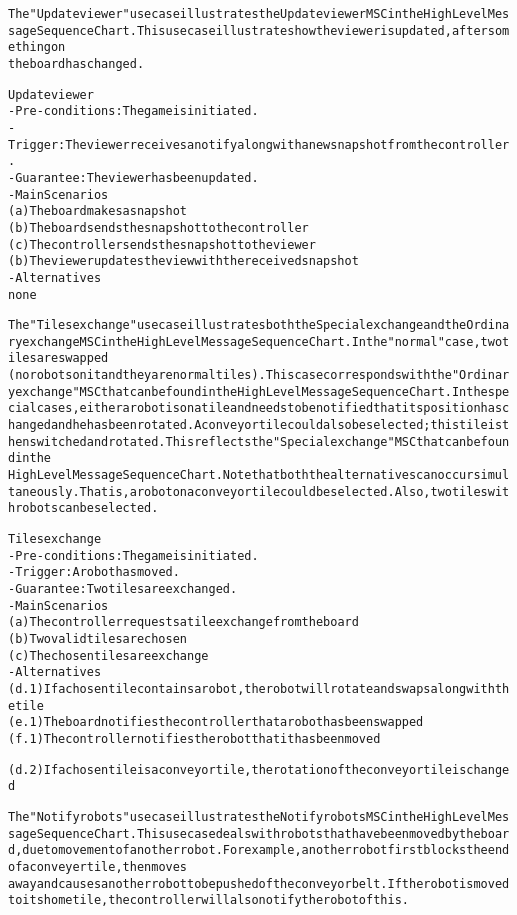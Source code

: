 \begin{alltt}
The "Update viewer" use case illustrates the Update viewer MSC in the High Level Message Sequence Chart. This use case illustrates how the viewer is updated, after something on 
the board has changed.

Update viewer
- Pre-conditions: The game is initiated.
- Trigger: The viewer receives a notify along with a new snapshot from the controller.
- Guarantee: The viewer has been updated.
- Main Scenarios
    (a) The board makes a snapshot
    (b) The board sends the snapshot to the controller
    (c) The controller sends the snapshot to the viewer
    (b) The viewer updates the view with the received snapshot
- Alternatives
    none

The "Tiles exchange" use case illustrates both the Special exchange and the Ordinary exchange MSC in the High Level Message Sequence Chart. In the "normal" case, two tiles are swapped
(no robots on it and they are normal tiles). This case corresponds with the "Ordinary exchange" MSC that can be found in the High Level Message Sequence Chart. In the special cases, either a robot is on a tile and needs to be notified that its position has changed and he has been rotated. A conveyor tile could also be selected; this tile is then switched and rotated. This reflects the "Special exchange" MSC that can be found in the
High Level Message Sequence Chart. Note that both the alternatives can occur simultaneously. That is, a robot on a conveyor tile could be selected. Also, two tiles with robots can be selected.

Tiles exchange
- Pre-conditions: The game is initiated.
- Trigger:  A robot has moved.
- Guarantee: Two tiles are exchanged.
- Main Scenarios
    (a) The controller requests a tile exchange from the board
    (b) Two valid tiles are chosen
    (c) The chosen tiles are exchange
- Alternatives
    (d.1) If a chosen tile contains a robot, the robot will rotate and swaps along with the tile
    (e.1) The board notifies the controller that a robot has been swapped
    (f.1) The controller notifies the robot that it has been moved

    (d.2) If a chosen tile is a conveyor tile, the rotation of the conveyor tile is changed

The "Notify robots" use case illustrates the Notify robots MSC in the High Level Message Sequence Chart. This use case deals with robots that have been moved by the board, due to movement of another robot. For example, another robot first blocks the end of a conveyer tile, then moves 
away and causes another robot to be pushed of the conveyor belt. If the robot is moved to its home tile, the controller will also notify the robot of this.\\


\end{alltt}
